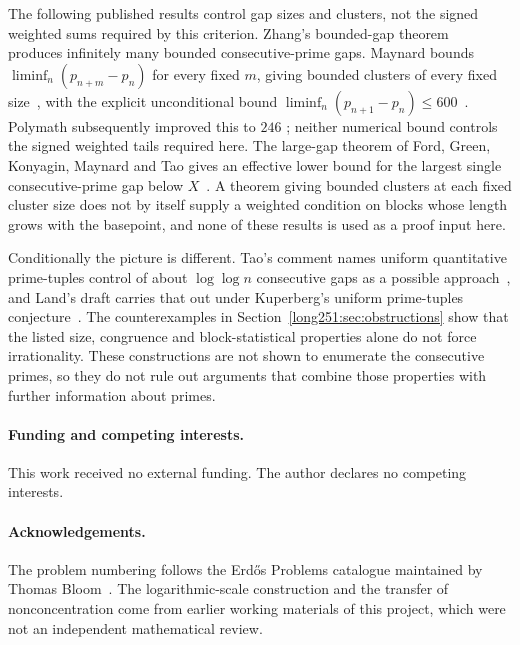 The following published results control gap sizes and clusters, not the
signed weighted sums required by this criterion.  Zhang's bounded-gap theorem~\cite[Theorem~1, p.~1122]{zhang2014}
produces infinitely many bounded consecutive-prime gaps.  Maynard bounds
$\liminf_n(p_{n+m}-p_n)$ for every fixed $m$, giving bounded clusters of every
fixed size~\cite[Theorem~1.1, p.~384]{maynard2015}, with the explicit
unconditional bound
$\liminf_n(p_{n+1}-p_n)\le600$~\cite[Theorem~1.3, p.~385]{maynard2015}.
Polymath subsequently improved this to $246$
\cite[Theorem~1.4(i) of arXiv v4]{polymath2014}; neither numerical bound
controls the signed weighted tails required here.  The large-gap
theorem of Ford, Green, Konyagin, Maynard and Tao gives an effective lower
bound for the largest single consecutive-prime gap below
$X$~\cite[Theorem~1]{fgkmt2018}.  A theorem giving bounded clusters at
each fixed cluster size does not by itself supply a weighted condition on
blocks whose length grows with the basepoint, and none of these results is
used as a proof input here.

Conditionally the picture is different.  Tao's comment names uniform
quantitative prime-tuples control of about $\log\log n$ consecutive gaps as a
possible approach~\cite[comment of 7 October 2025]{erdosproblems251thread}, and
Land's draft carries that out under Kuperberg's uniform prime-tuples
conjecture~\cite{land2026}.  The counterexamples in
Section~\ref{long251:sec:obstructions} show that the listed size,
congruence and block-statistical properties alone do not force
irrationality.  These constructions are not shown to enumerate the
consecutive primes, so they do not rule out arguments that combine those
properties with further information about primes.

\paragraph{Funding and competing interests.} This work received no external
funding.  The author declares no competing interests.

\paragraph{Acknowledgements.}

The problem numbering follows the Erd\H{o}s Problems catalogue maintained
by Thomas Bloom~\cite{erdosproblems}.  The logarithmic-scale construction
and the transfer of nonconcentration come from earlier working materials
of this project, which were not an independent mathematical review.


